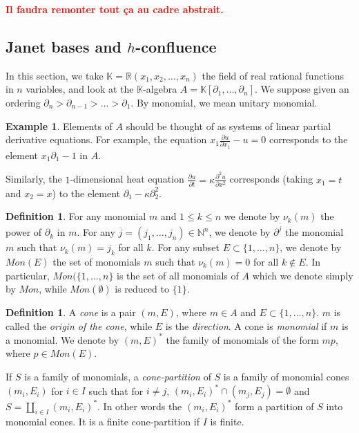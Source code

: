 \documentclass[10pt]{easychair}
\theoremstyle{definition}
\newtheorem{definition}[theorem]{Definition}
\newtheorem{example}[theorem]{Example}
\newcommand\todo[1]{{\bf\textcolor{red}{#1.}}}
\newcommand\K{\mathbb{K}}
\begin{document}
\todo{Il faudra remonter tout ça au cadre abstrait}

\subsection{Janet bases and $h$-confluence}
\label{sec:Janet_bases_and_h_confluence}

In this section, we take $\K = \mathbb R(x_1,x_2,\ldots,x_n)$ the field of real rational functions in $n$ variables, and look at the $\K$-algebra $A = \K[\partial_1,\ldots,\partial_n]$. We suppose given an ordering $\partial_n > \partial_{n-1} > \ldots > \partial_1$. By monomial, we mean unitary monomial.

\begin{example}
  Elements of $A$ should be thought of as systems of linear partial derivative equations. For example, the equation $x_1 \frac{\partial u}{\partial x_1} - u = 0$ corresponds to the element $x_1 \partial_1 - 1$ in $A$.

  Similarly, the $1$-dimensional heat equation $\frac{\partial u}{\partial t} = \kappa \frac{\partial^2 u}{\partial x^2}$  corresponds (taking $x_1 = t$ and $x_2 = x$) to the element $\partial_1 - \kappa \partial_2^2$.
\end{example}

\begin{definition}
 For any monomial $m$ and $1 \leq k \leq n$ we denote by $\nu_k(m)$ the power of $\partial_k$ in $m$.
For any $\overline j =(j_1,\ldots,j_n) \in \mathbb N^n$, we denote by $\partial^{\overline j}$ the monomial $m$ such that $\nu_k(m) = j_k$ for all $k$. For any subset $E \subset \{1,\ldots,n\}$, we denote by $Mon(E)$ the set of monomials $m$ such that $\nu_k(m) = 0$ for all $k \notin E$. In particular, $Mon(\{1,\ldots,n\}$ is the set of all monomials of $A$ which we denote simply by $Mon$, while $Mon(\emptyset)$ is reduced to $\{1\}$. 
\end{definition}

\begin{definition}
  A \emph{cone} is a pair $(m,E)$, where $m \in A$ and $E \subset \{1,\ldots,n\}$. $m$ is called the \emph{origin of the cone}, while $E$ is the \emph{direction}. A cone is \emph{monomial} if $m$ is a monomial. We denote by $(m,E)^*$ the family of monomials of the form $mp$, where $p \in Mon(E)$.

  If $S$ is a family of monomials, a \emph{cone-partition} of $S$ is a family of monomial cones $(m_i,E_i)$ for $i \in I$ such that for $i \neq j$, $(m_i,E_i)^* \cap (m_j,E_j) = \emptyset$ and $S = \coprod_{i \in I} (m_i,E_i)^*$. In other words the $(m_i,E_i)^*$ form a partition of $S$ into monomial cones. It is a finite cone-partition if $I$ is finite.
\end{definition}
\end{document}
